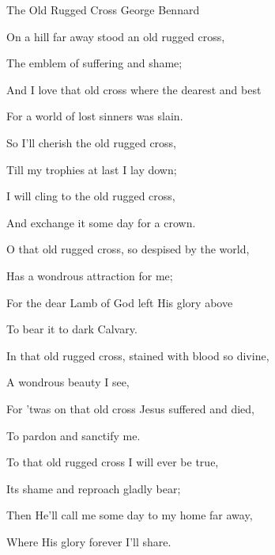 \documentclass[12pt]{book}
\begin{document}
\begin{song}{The Old Rugged Cross}{}
  {\SBPubDom}
  {George Bennard}
  {}
  {}

  \begin{SBVerse}
    On a hill far away stood an old rugged cross,

    The emblem of suffering and shame;

    And I love that old cross where the dearest and best

    For a world of lost sinners was slain.
  \end{SBVerse}

  \begin{SBOpGroup}
    So I'll cherish the old rugged cross,

    Till my trophies at last I lay down;

    I will cling to the old rugged cross,

    And exchange it some day for a crown.
  \end{SBOpGroup}

  \begin{SBVerse}
    O that old rugged cross, so despised by the world,

    Has a wondrous attraction for me;

    For the dear Lamb of God left His glory above

    To bear it to dark Calvary.
  \end{SBVerse}

  \begin{SBVerse}
    In that old rugged cross, stained with blood so divine,

    A wondrous beauty I see,

    For 'twas on that old cross Jesus suffered and died,

    To pardon and sanctify me.
  \end{SBVerse}

  \begin{SBVerse}
    To that old rugged cross I will ever be true,

    Its shame and reproach gladly bear;

    Then He'll call me some day to my home far away,

    Where His glory forever I'll share.
  \end{SBVerse}
\end{song}
\end{document}
